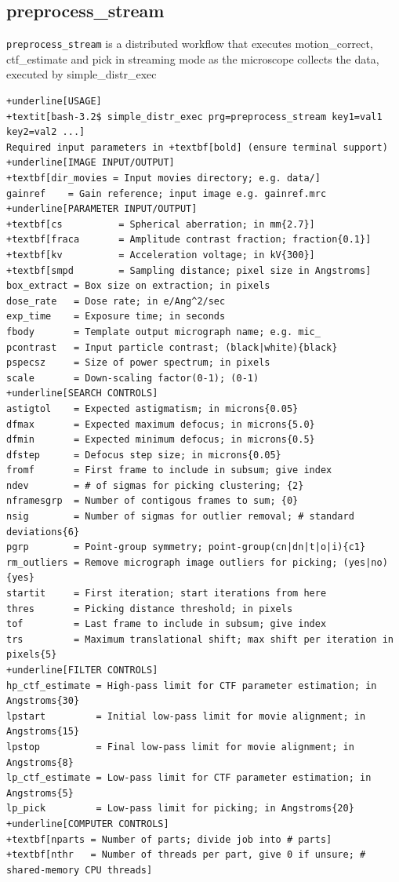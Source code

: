 \documentclass[a4paper,11pt]{article}
\newcommand{\prgname}[1]{\textcolor{NavyBlue}{\texttt{#1}}}
\begin{document}
\subsection{preprocess\_stream}
\label{preprocess_stream}
\prgname{preprocess\_stream} is a distributed workflow that executes motion\_correct, ctf\_estimate and pick in streaming mode as the microscope collects the data, executed by simple\_distr\_exec
\begin{Verbatim}[commandchars=+\[\],fontsize=\small,breaklines=true]
+underline[USAGE]
+textit[bash-3.2$ simple_distr_exec prg=preprocess_stream key1=val1 key2=val2 ...]
Required input parameters in +textbf[bold] (ensure terminal support)
+underline[IMAGE INPUT/OUTPUT]
+textbf[dir_movies = Input movies directory; e.g. data/]
gainref    = Gain reference; input image e.g. gainref.mrc
+underline[PARAMETER INPUT/OUTPUT]
+textbf[cs          = Spherical aberration; in mm{2.7}]
+textbf[fraca       = Amplitude contrast fraction; fraction{0.1}]
+textbf[kv          = Acceleration voltage; in kV{300}]
+textbf[smpd        = Sampling distance; pixel size in Angstroms]
box_extract = Box size on extraction; in pixels
dose_rate   = Dose rate; in e/Ang^2/sec
exp_time    = Exposure time; in seconds
fbody       = Template output micrograph name; e.g. mic_
pcontrast   = Input particle contrast; (black|white){black}
pspecsz     = Size of power spectrum; in pixels
scale       = Down-scaling factor(0-1); (0-1)
+underline[SEARCH CONTROLS]
astigtol    = Expected astigmatism; in microns{0.05}
dfmax       = Expected maximum defocus; in microns{5.0}
dfmin       = Expected minimum defocus; in microns{0.5}
dfstep      = Defocus step size; in microns{0.05}
fromf       = First frame to include in subsum; give index
ndev        = # of sigmas for picking clustering; {2}
nframesgrp  = Number of contigous frames to sum; {0}
nsig        = Number of sigmas for outlier removal; # standard deviations{6}
pgrp        = Point-group symmetry; point-group(cn|dn|t|o|i){c1}
rm_outliers = Remove micrograph image outliers for picking; (yes|no){yes}
startit     = First iteration; start iterations from here
thres       = Picking distance threshold; in pixels
tof         = Last frame to include in subsum; give index
trs         = Maximum translational shift; max shift per iteration in pixels{5}
+underline[FILTER CONTROLS]
hp_ctf_estimate = High-pass limit for CTF parameter estimation; in Angstroms{30}
lpstart         = Initial low-pass limit for movie alignment; in Angstroms{15}
lpstop          = Final low-pass limit for movie alignment; in Angstroms{8}
lp_ctf_estimate = Low-pass limit for CTF parameter estimation; in Angstroms{5}
lp_pick         = Low-pass limit for picking; in Angstroms{20}
+underline[COMPUTER CONTROLS]
+textbf[nparts = Number of parts; divide job into # parts]
+textbf[nthr   = Number of threads per part, give 0 if unsure; # shared-memory CPU threads]
\end{Verbatim}
\end{document}
